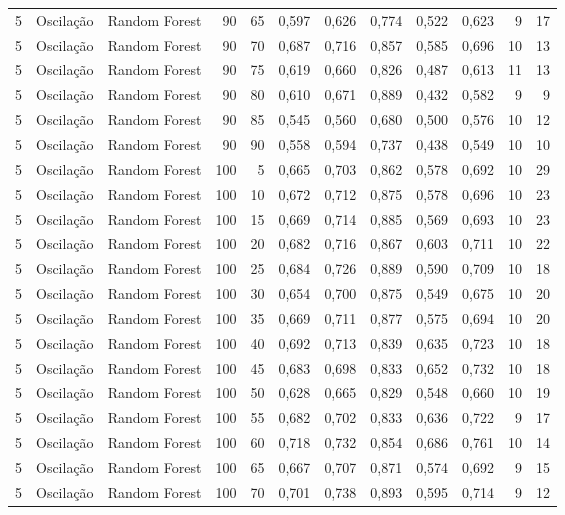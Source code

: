 \begin{longtable}{@{}rllrrrrrrrrr@{}}
5 & Oscilação & Random Forest & 90 & 65 & 0,597 & 0,626 & 0,774 & 0,522 & 0,623 & 9 & 17 \\
5 & Oscilação & Random Forest & 90 & 70 & 0,687 & 0,716 & 0,857 & 0,585 & 0,696 & 10 & 13 \\
5 & Oscilação & Random Forest & 90 & 75 & 0,619 & 0,660 & 0,826 & 0,487 & 0,613 & 11 & 13 \\
5 & Oscilação & Random Forest & 90 & 80 & 0,610 & 0,671 & 0,889 & 0,432 & 0,582 & 9 & 9 \\
5 & Oscilação & Random Forest & 90 & 85 & 0,545 & 0,560 & 0,680 & 0,500 & 0,576 & 10 & 12 \\
5 & Oscilação & Random Forest & 90 & 90 & 0,558 & 0,594 & 0,737 & 0,438 & 0,549 & 10 & 10 \\
5 & Oscilação & Random Forest & 100 & 5 & 0,665 & 0,703 & 0,862 & 0,578 & 0,692 & 10 & 29 \\
5 & Oscilação & Random Forest & 100 & 10 & 0,672 & 0,712 & 0,875 & 0,578 & 0,696 & 10 & 23 \\
5 & Oscilação & Random Forest & 100 & 15 & 0,669 & 0,714 & 0,885 & 0,569 & 0,693 & 10 & 23 \\
5 & Oscilação & Random Forest & 100 & 20 & 0,682 & 0,716 & 0,867 & 0,603 & 0,711 & 10 & 22 \\
5 & Oscilação & Random Forest & 100 & 25 & 0,684 & 0,726 & 0,889 & 0,590 & 0,709 & 10 & 18 \\
5 & Oscilação & Random Forest & 100 & 30 & 0,654 & 0,700 & 0,875 & 0,549 & 0,675 & 10 & 20 \\
5 & Oscilação & Random Forest & 100 & 35 & 0,669 & 0,711 & 0,877 & 0,575 & 0,694 & 10 & 20 \\
5 & Oscilação & Random Forest & 100 & 40 & 0,692 & 0,713 & 0,839 & 0,635 & 0,723 & 10 & 18 \\
5 & Oscilação & Random Forest & 100 & 45 & 0,683 & 0,698 & 0,833 & 0,652 & 0,732 & 10 & 18 \\
5 & Oscilação & Random Forest & 100 & 50 & 0,628 & 0,665 & 0,829 & 0,548 & 0,660 & 10 & 19 \\
5 & Oscilação & Random Forest & 100 & 55 & 0,682 & 0,702 & 0,833 & 0,636 & 0,722 & 9 & 17 \\
5 & Oscilação & Random Forest & 100 & 60 & 0,718 & 0,732 & 0,854 & 0,686 & 0,761 & 10 & 14 \\
5 & Oscilação & Random Forest & 100 & 65 & 0,667 & 0,707 & 0,871 & 0,574 & 0,692 & 9 & 15 \\
5 & Oscilação & Random Forest & 100 & 70 & 0,701 & 0,738 & 0,893 & 0,595 & 0,714 & 9 & 12 \\

\end{longtable}
